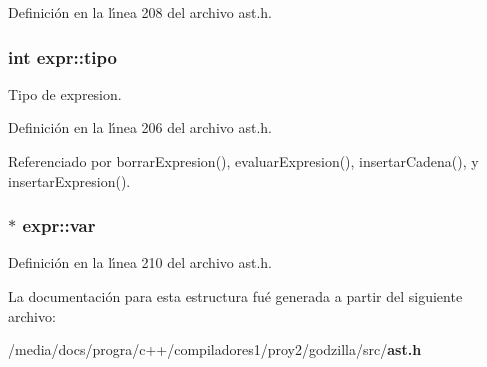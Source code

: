Definici\'{o}n en la l\'{\i}nea 208 del archivo ast.h.
\subsubsection{\setlength{\rightskip}{0pt plus 5cm}int {\bf expr::tipo}}\label{structexpr_o0}


Tipo de expresion. 



Definici\'{o}n en la l\'{\i}nea 206 del archivo ast.h.

Referenciado por borrar\-Expresion(), evaluar\-Expresion(), insertar\-Cadena(), y insertar\-Expresion().
\subsubsection{$\ast$ {\bf expr::var}}\label{structexpr_o3}




Definici\'{o}n en la l\'{\i}nea 210 del archivo ast.h.

La documentaci\'{o}n para esta estructura fu\'{e} generada a partir del siguiente archivo:\begin{CompactItemize}
\item 
/media/docs/progra/c++/compiladores1/proy2/godzilla/src/{\bf ast.h}\end{CompactItemize}
